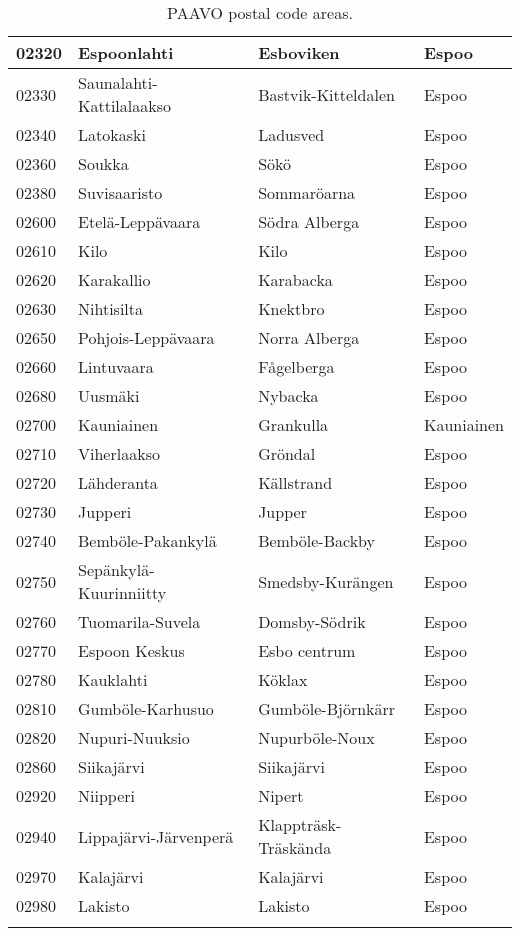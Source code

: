 \begin{longtable}{llll}
    02320 & Espoonlahti & Esboviken & Espoo \\ [0.25ex] \hline
    02330 & Saunalahti-Kattilalaakso & Bastvik-Kitteldalen & Espoo \\ [0.25ex] \hline
    02340 & Latokaski & Ladusved & Espoo \\ [0.25ex] \hline
    02360 & Soukka & Sökö & Espoo \\ [0.25ex] \hline
    02380 & Suvisaaristo & Sommaröarna & Espoo \\ [0.25ex] \hline
    02600 & Etelä-Leppävaara & Södra Alberga & Espoo \\ [0.25ex] \hline
    02610 & Kilo & Kilo & Espoo \\ [0.25ex] \hline
    02620 & Karakallio & Karabacka & Espoo \\ [0.25ex] \hline
    02630 & Nihtisilta & Knektbro & Espoo \\ [0.25ex] \hline
    02650 & Pohjois-Leppävaara & Norra Alberga & Espoo \\ [0.25ex] \hline
    02660 & Lintuvaara & Fågelberga & Espoo \\ [0.25ex] \hline
    02680 & Uusmäki & Nybacka & Espoo \\ [0.25ex] \hline
    02700 & Kauniainen & Grankulla & Kauniainen \\ [0.25ex] \hline
    02710 & Viherlaakso & Gröndal & Espoo \\ [0.25ex] \hline
    02720 & Lähderanta & Källstrand & Espoo \\ [0.25ex] \hline
    02730 & Jupperi & Jupper & Espoo \\ [0.25ex] \hline
    02740 & Bemböle-Pakankylä & Bemböle-Backby & Espoo \\ [0.25ex] \hline
    02750 & Sepänkylä-Kuurinniitty & Smedsby-Kurängen & Espoo \\ [0.25ex] \hline
    02760 & Tuomarila-Suvela & Domsby-Södrik & Espoo \\ [0.25ex] \hline
    02770 & Espoon Keskus & Esbo centrum & Espoo \\ [0.25ex] \hline
    02780 & Kauklahti & Köklax & Espoo \\ [0.25ex] \hline
    02810 & Gumböle-Karhusuo & Gumböle-Björnkärr & Espoo \\ [0.25ex] \hline
    02820 & Nupuri-Nuuksio & Nupurböle-Noux & Espoo \\ [0.25ex] \hline
    02860 & Siikajärvi & Siikajärvi & Espoo \\ [0.25ex] \hline
    02920 & Niipperi & Nipert & Espoo \\ [0.25ex] \hline
    02940 & Lippajärvi-Järvenperä & Klappträsk-Träskända & Espoo \\ [0.25ex] \hline
    02970 & Kalajärvi & Kalajärvi & Espoo \\ [0.25ex] \hline
    02980 & Lakisto & Lakisto & Espoo \\ [0.75ex] \hline
    \caption[PAAVO postal code areas]{PAAVO postal code areas.}
    \label{tab:appendix_postalcodes}
\end{longtable}

